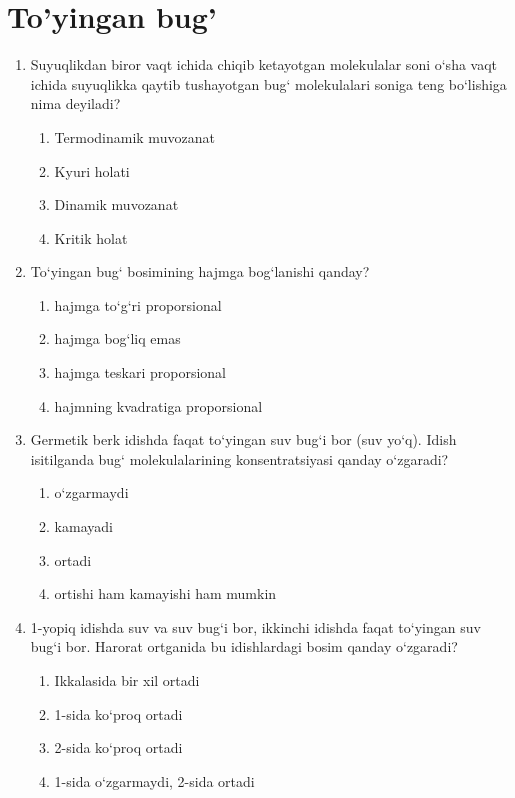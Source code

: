 \section{To'yingan bug'}


\begin{enumerate}

\item Suyuqlikdan biror vaqt ichida chiqib ketayotgan molekulalar soni o‘sha vaqt ichida suyuqlikka qaytib tushayotgan bug‘ molekulalari soniga teng bo‘lishiga nima deyiladi?
\begin{enumerate}[label=\Alph*)]
\item Termodinamik muvozanat
\item Kyuri holati
\item Dinamik muvozanat
\item Kritik holat
\end{enumerate}

\item To‘yingan bug‘ bosimining hajmga bog‘lanishi qanday?
\begin{enumerate}[label=\Alph*)]
\item hajmga to‘g‘ri proporsional
\item hajmga bog‘liq emas
\item hajmga teskari proporsional
\item hajmning kvadratiga proporsional
\end{enumerate}

\item Germetik berk idishda faqat to‘yingan suv bug‘i bor (suv yo‘q). Idish isitilganda bug‘ molekulalarining konsentratsiyasi qanday o‘zgaradi?
\begin{enumerate}[label=\Alph*)]
\item o‘zgarmaydi
\item kamayadi
\item ortadi
\item ortishi ham kamayishi ham mumkin
\end{enumerate}

\item 1-yopiq idishda suv va suv bug‘i bor, ikkinchi idishda faqat to‘yingan suv bug‘i bor. Harorat ortganida bu idishlardagi bosim qanday o‘zgaradi?
\begin{enumerate}[label=\Alph*)]
\item Ikkalasida bir xil ortadi
\item 1-sida ko‘proq ortadi
\item 2-sida ko‘proq ortadi
\item 1-sida o‘zgarmaydi, 2-sida ortadi
\end{enumerate}


\end{enumerate}

